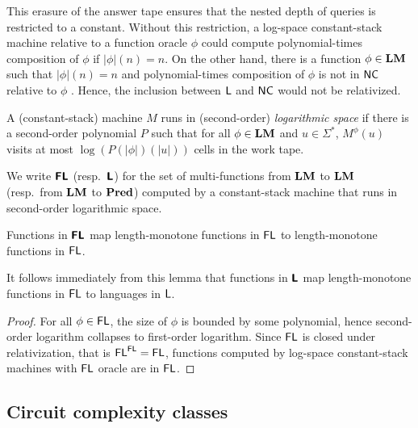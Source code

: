 \documentclass[envcountsame,orivec,oribibl]{llncs}
\begin{document}
This erasure of the answer tape
ensures that the nested depth of queries is restricted to a constant.
Without this restriction, a log-space constant-stack machine relative to 
a function oracle $\phi$ could compute polynomial-times composition
of $\phi$ if $|\phi|(n) = n$.
On the other hand, there is a function $\phi \in \mathbf{LM}$ such that $|\phi|(n) = n$
and polynomial-times composition of $\phi$ is not in $\mathsf{NC}$ relative to $\phi$ \cite{aehlig2007relativizing}.
Hence, the inclusion between $\mathsf{L}$ and $\mathsf{NC}$ would not be relativized.



\begin{definition}
 A (constant-stack) machine $M$ runs in (second-order) \emph{logarithmic space}
 if there is a second-order polynomial $P$ such that for all $\phi \in \mathbf{LM}$
 and $u \in \Sigma^*$, $M^\phi(u)$ visits at most $\log(P(|\phi|)(|u|))$ cells
 in the work tape.
\end{definition}

\begin{definition}
 We write $\text{\bfseries \sffamily \upshape FL}$ (resp.\ $\text{\bfseries \sffamily \upshape L}$) for the set of multi-functions 
 from $\mathbf{LM}$ to $\mathbf{LM}$ (resp.\ from $\mathbf{LM}$ to $\mathbf{Pred}$)
 computed by a constant-stack machine that runs in second-order logarithmic space.
\end{definition}

\begin{lemma}
\label{lemma:Ltwo-maps-L-to-L}
 Functions in $\text{\bfseries \sffamily \upshape FL}$ map 
 length-monotone functions in $\mathsf{FL}$
 to length-monotone functions in $\mathsf{FL}$.
\end{lemma}

It follows immediately from this lemma that functions in $\text{\bfseries \sffamily \upshape L}$ map
length-monotone functions in $\mathsf{FL}$ to languages in $\mathsf{L}$.

\begin{proof}
For all $\phi \in \mathsf{FL}$, the size of $\phi$ is bounded by some polynomial,
hence second-order logarithm collapses to first-order logarithm.
Since $\mathsf{FL}$ is closed under relativization, that is $\mathsf{FL}^{\mathsf{FL}} = \mathsf{FL}$,
functions computed by log-space constant-stack machines with $\mathsf{FL}$ oracle are in $\mathsf{FL}$.
\end{proof}


\subsection{Circuit complexity classes}
\end{document}
